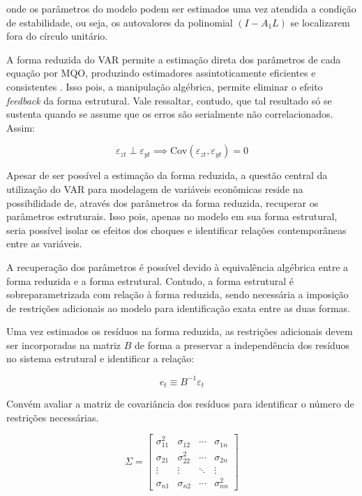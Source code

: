onde os parâmetros do modelo podem ser estimados uma vez atendida a condição de estabilidade, ou seja, os autovalores da polinomial \((I - A_1L)\) se localizarem fora do círculo unitário.

A forma reduzida do VAR permite a estimação direta dos parâmetros de cada equação por MQO, produzindo estimadores assintoticamente eficientes e consistentes \textcite{enders_applied_2015}. Isso pois, a manipulação algébrica, permite eliminar o efeito \textit{feedback} da forma estrutural. Vale ressaltar, contudo, que tal resultado só se sustenta quando se assume que os erros são serialmente não correlacionados. Assim:

\begin{equation}
\varepsilon_{zt} \perp \varepsilon_{yt} \implies \text{Cov}(\varepsilon_{zt}, \varepsilon_{yt}) = 0
\end{equation}

Apesar de ser possível a estimação da forma reduzida, a questão central da utilização do VAR para modelagem de variáveis econômicas reside na possibilidade de, através dos parâmetros da forma reduzida, recuperar os parâmetros estruturais. Isso pois, apenas no modelo em sua forma estrutural, seria possível isolar os efeitos dos choques e identificar relações contemporâneas entre as variáveis.

A recuperação dos parâmetros é possível devido à equivalência algébrica entre a forma reduzida e a forma estrutural. Contudo, a forma estrutural é sobreparametrizada com relação à forma reduzida, sendo necessária a imposição de restrições adicionais ao modelo para identificação exata entre as duas formas.

Uma vez estimados os resíduos na forma reduzida, as restrições adicionais devem ser incorporadas na matriz \(B\) de forma a preservar a independência dos resíduos no sistema estrutural e identificar a relação:

\begin{equation}
e_t \equiv B^{-1}\varepsilon_t
\end{equation}


Convém avaliar a matriz de covariância dos resíduos para identificar o número de restrições necessárias. 

\begin{equation}\Sigma = \begin{bmatrix}
\sigma_{11}^2 & \sigma_{12} & \cdots & \sigma_{1n} \\
\sigma_{21} & \sigma_{22}^2 & \cdots & \sigma_{2n} \\
\vdots & \vdots & \ddots & \vdots \\
\sigma_{n1} & \sigma_{n2} & \cdots & \sigma_{nn}^2 
\end{bmatrix}\end{equation}

